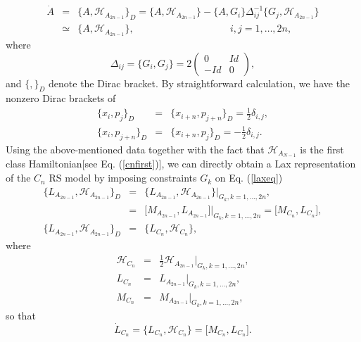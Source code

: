 \documentclass[a4paper,12pt]{article}
\begin{document}
\begin{eqnarray}
\dot{A} &=&\{A,\mathcal{H}_{A_{2n-1}}\}_{D}=\{A,\mathcal{H}
_{A_{2n-1}}\}-\{A,G_{i}\}\Delta _{ij}^{-1}\{G_{j},\mathcal{H}_{A_{2n-1}}\}
\nonumber \\
&\simeq &\{A,\mathcal{H}_{A_{2n-1}}\},\qquad \ \ \ \ \ \ \ \
\ \ \ \ \ \ \ \
\ \ \ \ \ \ \ \ \ \ \ \ \ \ \ \ \ \ \ i,j=1,\ldots ,2n,	 \label{cnevo}
\end{eqnarray}
where
\begin{equation}
\Delta _{ij}=\{G_{i},G_{j}\}=2\left(
\begin{array}{cc}
0 & Id \\
-Id & 0
\end{array}
\right) ,
\end{equation}
and $\{,\}_{D}$ denote the Dirac bracket. By straightforward
calculation, we have the nonzero Dirac brackets of
\begin{eqnarray}
\{x_{i},p_{j}\}_{D} &=&\{x_{i+n},p_{j+n}\}_{D}=\frac{1}{2}\delta _{i,j},
\nonumber \\
\{x_{i},p_{j+n}\}_{D} &=&\{x_{i+n},p_{j}\}_{D}=-\frac{1}{2}\delta _{i,j}.
\label{DBra}
\end{eqnarray}
Using the above-mentioned data together with the fact that
$\mathcal{H}
_{A_{N-1}}$ is the first class Hamiltonian[see Eq. (\ref{cnfirst})], we can
directly obtain a Lax representation of the $C_{n}$ RS model
by imposing constraints $G_{k}$ on Eq. (\ref{laxeq})
\begin{eqnarray}
\{L_{A_{2n-1}},\mathcal{H}_{A_{2n-1}}\}_{D} &=&\{L_{A_{2n-1}},\mathcal{H}
_{A_{2n-1}}\}|_{G_{k},k=1,...,2n},  \nonumber \\
&=&\lbrack M_{A_{2n-1}},L_{A_{2n-1}}\rbrack
|_{G_{k},k=1,...,2n}=\lbrack M_{C_{n}},L_{C_{n}}\rbrack , \\
\{L_{A_{2n-1}},\mathcal{H}_{A_{2n-1}}\}_{D} &=&\{L_{C_{n}},\mathcal{H}
_{C_{n}}\},  \label{dicn}
\end{eqnarray}
where
\begin{eqnarray}
\mathcal{H}_{C_{n}} &=&\frac{1}{2}\mathcal{H}_{A_{2n-1}}|_{G_{k},k=1,...,2n},
\nonumber \\
L_{C_{n}} &=&L_{A_{2n-1}}|_{G_{k},k=1,...,2n},
\label{reduce} \\ M_{C_{n}}
&=&M_{A_{2n-1}}|_{G_{k},k=1,...,2n},  \nonumber
\end{eqnarray}
so that
\begin{equation}
\dot{L}_{C_{n}}=\{L_{C_{n}},\mathcal{H}_{C_{n}}\}=\lbrack
M_{C_{n}},L_{C_{n}}\rbrack .  \label{cnLax}
\end{equation}
\end{document}

